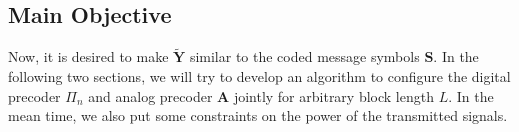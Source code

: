 \documentclass[12pt,draftclsnofoot,onecolumn,journal]{IEEEtran}
\begin{document}
%
% 
% 
%





\subsection{Main Objective}
Now, it is desired to make $\tilde{\mathbf Y}$ similar to the coded message symbols $\mathbf S$. In the following two sections, we will try to develop an algorithm to configure the digital precoder $\Pi_n$ and analog precoder $\mathbf A$ jointly for arbitrary block length $L$. In the mean time, we also put some constraints on the power of the transmitted signals.
\end{document}
